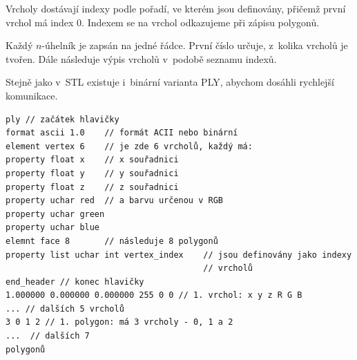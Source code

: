 \documentclass[12pt]{report}			%
\begin{document}
                Vrcholy dostávají indexy podle pořadí, ve kterém jsou definovány, přičemž první vrchol má index 0. Indexem se na vrchol odkazujeme při zápisu polygonů.\cite{ply}

                Každý $n$-úhelník je zapsán na jedné řádce. První číslo určuje, z~kolika vrcholů je tvořen. Dále následuje výpis vrcholů v~podobě seznamu indexů. \cite{ply}

                Stejně jako v~STL existuje i~binární varianta PLY, abychom dosáhli rychlejší komunikace. \cite{sustainabilityofdigitalformatsply}

                \begin{lstlisting}[style=plystyle]
ply // začátek hlavičky
format ascii 1.0    // formát ACII nebo binární
element vertex 6    // je zde 6 vrcholů, každý má:
property float x    // x souřadnici
property float y    // y souřadnici
property float z    // z souřadnici
property uchar red  // a barvu určenou v RGB
property uchar green
property uchar blue
elemnt face 8       // následuje 8 polygonů
property list uchar int vertex_index    // jsou definovány jako indexy
                                        // vrcholů
end_header // konec hlavičky
1.000000 0.000000 0.000000 255 0 0 // 1. vrchol: x y z R G B
... // dalších 5 vrcholů
3 0 1 2 // 1. polygon: má 3 vrcholy - 0, 1 a 2
...  // dalších 7 
polygonů
                \end{lstlisting}
\end{document}

